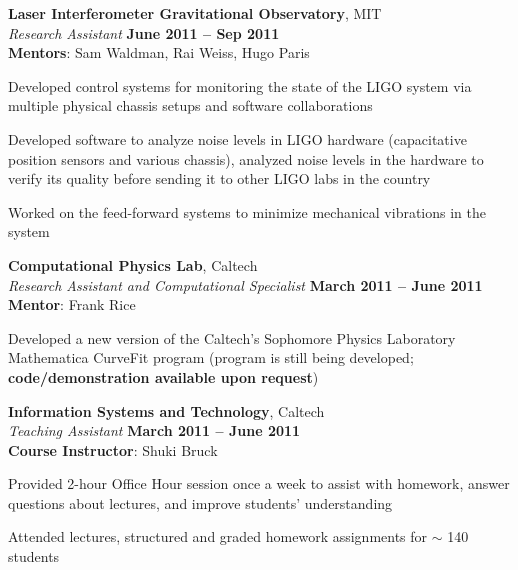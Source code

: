 \documentclass[margin,line]{resume}
\begin{document}
\begin{resume}
    \textbf{Laser Interferometer Gravitational Observatory}, MIT \vspace{2mm}\\\vspace{1mm}%
    \textsl{Research Assistant} \hfill \textbf{June 2011 -- Sep 2011}\\
    \textbf{Mentors}: Sam Waldman, Rai Weiss, Hugo Paris\vspace{-3mm}\\\vspace{-1mm}%
	\begin{list2}
		\item Developed control systems for monitoring the state of the LIGO system via multiple physical chassis setups and software collaborations
		\item Developed software to analyze noise levels in LIGO hardware (capacitative position sensors and various chassis), analyzed noise levels in the hardware to verify its quality before sending it to other LIGO labs in the country
		\item Worked on the feed-forward systems to minimize mechanical vibrations in the system
	\end{list2}

    \textbf{Computational Physics Lab}, Caltech \vspace{2mm}\\\vspace{1mm}%
    \textsl{Research Assistant and Computational Specialist} \hfill \textbf{March 2011 -- June 2011}\\
    \textbf{Mentor}: Frank Rice\vspace{-3mm}\\\vspace{-1mm}%
	\begin{list2}
		\item Developed a new version of the Caltech's Sophomore Physics Laboratory Mathematica CurveFit program (program is still being developed; \textbf{code/demonstration available upon request})
	\end{list2}

	\textbf{Information Systems and Technology}, Caltech \vspace{2mm}\\\vspace{1mm}%
    \textsl{Teaching Assistant} \hfill \textbf{March 2011 -- June 2011}\vspace{1.5mm}\\\vspace{0mm}%
    \textbf{Course Instructor}: Shuki Bruck\vspace{-3mm}\\\vspace{-1mm}%
	\begin{list2}
		\item Provided 2-hour Office Hour session once a week to assist with homework, answer questions about lectures, and improve students' understanding
		\item Attended lectures, structured and graded homework assignments for $\sim$ 140 students
	\end{list2}


\end{resume}
\end{document}
